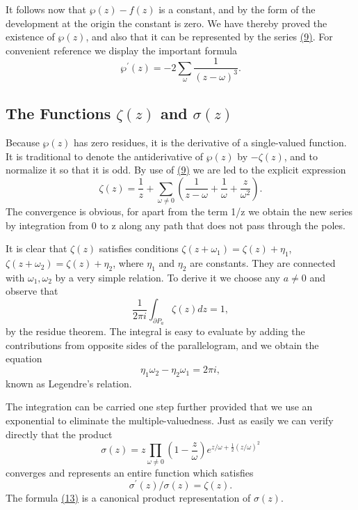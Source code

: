 It follows now that $\wp(z) - f(z)$ is a constant, and by the form of the development at the origin the constant is zero. We have thereby proved the existence of $\wp(z)$, and also that it can be represented by the series \hyperref[eq:7.9]{(9)}. For convenient reference we display the important formula
\begin{equation*}
\wp^ {\prime} (z) = - 2 \sum_ {\omega} \frac {1}{(z - \omega) ^ {3}}.\tag{11}\label{eq:7.11}
\end{equation*}
\setcounter{section}{3}\setcounter{subsection}{1}\subsection{\texorpdfstring{The Functions $\zeta(z)$ and $\sigma(z)$}{The Functions ζ(z) and σ(z)}}\label{sec:7.3.2}
Because $\wp(z)$ has zero residues, it is the derivative of a single-valued function. It is traditional to denote the antiderivative of $\wp(z)$ by $-\zeta(z)$, and to normalize it so that it is odd. By use of \hyperref[eq:7.9]{(9)} we are led to the explicit expression
\begin{equation*}
\zeta (z) = \frac {1}{z} + \sum_ {\omega \neq 0} \left(\frac {1}{z - \omega} + \frac {1}{\omega} + \frac {z}{\omega^ {2}}\right).\tag{12}\label{eq:7.12}
\end{equation*}
The convergence is obvious, for apart from the term 1/z we obtain the new series by integration from 0 to z along any path that does not pass through the poles.

It is clear that $\zeta(z)$ satisfies conditions $\zeta(z + \omega_1) = \zeta(z) + \eta_1$, $\zeta(z + \omega_2) = \zeta(z) + \eta_2$, where $\eta_1$ and $\eta_2$ are constants. They are connected with $\omega_1, \omega_2$ by a very simple relation. To derive it we choose any $a \neq 0$ and observe that
\begin{equation*}
\frac {1}{2 \pi i} \int_ {\partial P _ {a}} \zeta (z) d z = 1,
\end{equation*}
by the residue theorem. The integral is easy to evaluate by adding the contributions from opposite sides of the parallelogram, and we obtain the equation
\begin{equation*}
\eta_ {1} \omega_ {2} - \eta_ {2} \omega_ {1} = 2 \pi i,
\end{equation*}
known as Legendre's relation.

The integration can be carried one step further provided that we use an exponential to eliminate the multiple-valuedness. Just as easily we can verify directly that the product
\begin{equation*}
\sigma (z) = z \prod_ {\omega \neq 0} \left(1 - \frac {z}{\omega}\right) e ^ {z / \omega + \frac {1}{2} (z / \omega) ^ {2}}\tag{13}\label{eq:7.13}
\end{equation*}
converges and represents an entire function which satisfies
\begin{equation*}
\sigma^ {\prime} (z) / \sigma (z) = \zeta (z).
\end{equation*}
The formula \hyperref[eq:7.13]{(13)} is a canonical product representation of $\sigma(z)$.

